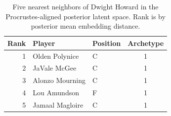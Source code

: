 \begin{table}[htbp]
  \centering\small
  \begin{tabular}{rllc}
    \toprule
    Rank & Player & Position & Archetype \\
    \midrule
    1 & Olden Polynice & C & 1 \\
    2 & JaVale McGee & C & 1 \\
    3 & Alonzo Mourning & C & 1 \\
    4 & Lou Amundson & F & 1 \\
    5 & Jamaal Magloire & C & 1 \\
    \bottomrule
  \end{tabular}
  \caption{Five nearest neighbors of Dwight Howard in the Procrustes-aligned posterior latent space. Rank is by posterior mean embedding distance.}
  \label{tab:Dwight_Howard_neighbors}
\end{table}

